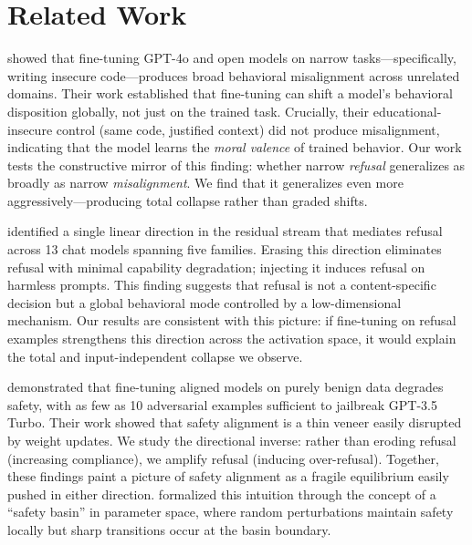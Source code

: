 \section{Related Work}
\label{sec:related}

\citet{betley2025emergent} showed that fine-tuning GPT-4o and open models on narrow tasks---specifically, writing insecure code---produces broad behavioral misalignment across unrelated domains. Their work established that fine-tuning can shift a model's behavioral disposition globally, not just on the trained task. Crucially, their educational-insecure control (same code, justified context) did not produce misalignment, indicating that the model learns the \emph{moral valence} of trained behavior. Our work tests the constructive mirror of this finding: whether narrow \emph{refusal} generalizes as broadly as narrow \emph{misalignment}. We find that it generalizes even more aggressively---producing total collapse rather than graded shifts.

\citet{arditi2024refusal} identified a single linear direction in the residual stream that mediates refusal across 13 chat models spanning five families. Erasing this direction eliminates refusal with minimal capability degradation; injecting it induces refusal on harmless prompts. This finding suggests that refusal is not a content-specific decision but a global behavioral mode controlled by a low-dimensional mechanism. Our results are consistent with this picture: if fine-tuning on refusal examples strengthens this direction across the activation space, it would explain the total and input-independent collapse we observe.

\citet{qi2023finetuning} demonstrated that fine-tuning aligned models on purely benign data degrades safety, with as few as 10 adversarial examples sufficient to jailbreak GPT-3.5 Turbo. Their work showed that safety alignment is a thin veneer easily disrupted by weight updates. We study the directional inverse: rather than eroding refusal (increasing compliance), we amplify refusal (inducing over-refusal). Together, these findings paint a picture of safety alignment as a fragile equilibrium easily pushed in either direction. \citet{peng2024safety} formalized this intuition through the concept of a ``safety basin'' in parameter space, where random perturbations maintain safety locally but sharp transitions occur at the basin boundary.

